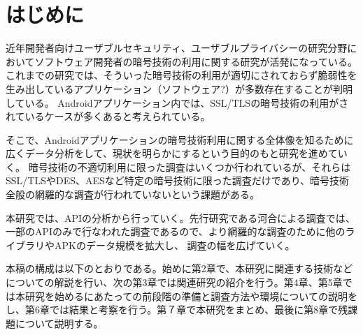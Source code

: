 \newpage
\section{はじめに} 
近年開発者向けユーザブルセキュリティ、ユーザブルプライバシーの研究分野においてソフトウェア開発者の暗号技術の利用に関する研究が活発になっている。
これまでの研究では、そういった暗号技術の利用が適切にされておらず脆弱性を生み出しているアプリケーション（ソフトウェア?）が多数存在することが判明している。
Androidアプリケーション内では、SSL/TLSの暗号技術の利用がされているケースが多くあると考えられている。

そこで、Androidアプリケーションの暗号技術利用に関する全体像を知るために広くデータ分析をして、現状を明らかにするという目的のもと研究を進めていく。
暗号技術の不適切利用に限った調査はいくつか行われているが、それらはSSL/TLSやDES、AESなど特定の暗号技術に限った調査だけであり、暗号技術全般の網羅的な調査が行われていないという課題がある。

本研究では、APIの分析から行っていく。先行研究である河合による調査では、一部のAPIのみで行なわれた調査であるので、より網羅的な調査のために他のライブラリやAPKのデータ規模を拡大し、
調査の幅を広げていく。

本稿の構成は以下のとおりである。始めに第2章で、本研究に関連する技術などについての解説を行い、次の第3章では関連研究の紹介を行う。第4章、第5章では本研究を始めるにあたっての前段階の準備と調査方法や環境についての説明をし、第6章では結果と考察を行う。第７章で本研究をまとめ、最後に第8章で残課題について説明する。